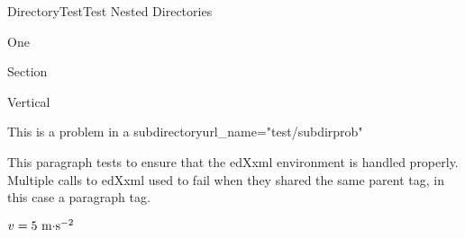 \documentclass[12pt]{article}
\def\units#1{\mathrm{~#1}}
\def\.{\smash\cdot}
\begin{document}
\begin{edXcourse}{DirectoryTest}{Test Nested Directories}

\begin{edXchapter}{One}

\begin{edXsequential}{Section}

\begin{edXvertical}{Vertical}

\begin{edXproblem}{This is a problem in a subdirectory}{url_name="test/subdirprob"}

\edXxml{}
This paragraph tests to ensure that the edXxml environment is handled properly.  Multiple calls to edXxml used to fail when they shared the same parent tag, in this case a paragraph tag.
\edXxml{}

$v = 5 \units{m\.s^{-2}}$

\end{edXproblem}

\end{edXvertical}

\end{edXsequential}

\end{edXchapter}

\end{edXcourse}
\end{document}
